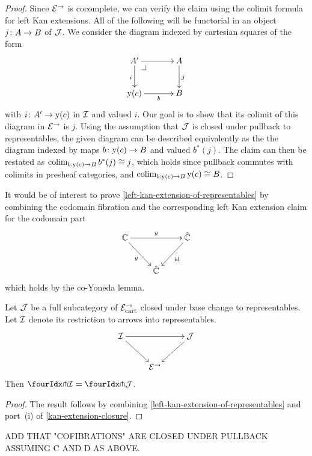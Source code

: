 \documentclass[reqno,10pt,a4paper,oneside]{amsart}
\begin{document}
\begin{proof}
Since $\catE^{\to}$ is cocomplete, we can verify the claim using  the colimit formula for left Kan extensions.
All of the following will be functorial in an object $j \co A \to B$ of $\cal{J}$.
We consider the diagram indexed by cartesian squares of the form
\[
\xymatrix@C=1.2cm{
  A'
  \ar[r]
  \ar[d]_{i}
  \pullback{dr}
&
  A
  \ar[d]^{j}
\\
  \yon(c) 
  \ar[r]_-b 
&
  B
}
\]
with $i \co A' \to \yon(c)$ in $\cal{I}$ and valued $i$.
Our goal is to show that its colimit of this diagram in $\catE^{\to}$ is $j$.
Using the assumption that $\cal{J}$ is closed under pullback to representables, the given diagram
can be described equivalently as the the diagram indexed by maps $b \co \yon(c) \to B$ and valued $b^*(j)$. The claim can then be restated as  $\colim_{b : \yon(c) \to B} b^*(j) \iso j$, which 
holds since pullback commutes with colimits in presheaf categories, and  $\colim_{b : \yon(c) \to B} \yon(c) \iso B$.
\end{proof}


\begin{remark} It would be of interest to prove \cref{left-kan-extension-of-representables} by combining 
the codomain fibration and the corresponding left Kan extension claim for the codomain part
\[
\xymatrix{
  \cat{C}
  \ar[rr]^{y}
  \ar[dr]_{y}
&&
  \hat{\catC}
  \ar[dl]^{\id}
\\&
  \hat{\cat{C}}
}
\]
which holds by the co-Yoneda lemma.
\end{remark}



\begin{proposition}
\label{awfs-on-arrows-into-representables}
Let $\cal{J}$ be a full subcategory of $\catE_{\cart}^{\to}$ closed under base change to representables.
Let $\cal{I}$ denote its restriction to arrows into representables.
\[
\xymatrix{
  \cal{I}
  \ar[rr]
  \ar[dr]
&&
  \cal{J}
  \ar[dl]
\\&
  \catE^{\to}
}
\]
Then $\liftr{\cal{I}} = \liftr{\cal{J}}$.
\end{proposition}

\begin{proof} The result follows by combining \cref{left-kan-extension-of-representables} and part~(i) of \cref{kan-extension-closure}. 
\end{proof}

ADD THAT "COFIBRATIONS" ARE CLOSED UNDER PULLBACK ASSUMING C AND D AS ABOVE.
\end{document}
